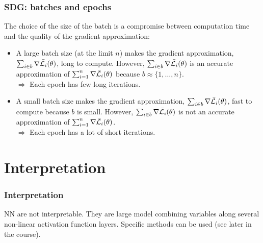 \begin{frame}
\frametitle{SDG: batches and epochs}
The choice of the size of the batch is a compromise between computation time and the quality of the gradient approximation:
\begin{itemize}
\item A large batch size (at the limit $n$) makes the gradient approximation, $\sum_{i\in b} \nabla \bar{\cal L}_i(\theta)$, long to compute. However, $\sum_{i \in b} \nabla \bar{\cal L}_i(\theta)$ is an accurate approximation of $\sum_{i=1}^n \nabla \bar{\cal L}_i(\theta)$ because $b\approx \{1,\ldots,n\}$.\\ 
\vspace{0.2cm}
$\Rightarrow$ Each epoch has few long iterations. 
\item A small batch size makes the gradient approximation, $\sum_{i\in b} \nabla \bar{\cal L}_i(\theta)$, fast to compute because $b$ is small. However, $\sum_{i \in b} \nabla \bar{\cal L}_i(\theta)$ is not an accurate approximation of $\sum_{i=1}^n \nabla \bar{\cal L}_i(\theta)$. \\ 
\vspace{0.2cm}
$\Rightarrow$ Each epoch has a lot of short iterations.
\end{itemize}
\end{frame}
\section{Interpretation}
\begin{frame}
\frametitle{Interpretation}
NN are not interpretable. They are large model combining variables along several non-linear activation function layers. Specific methods can be used (see later in the course).
\end{frame}
